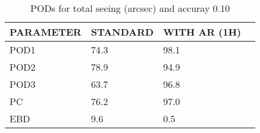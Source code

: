 \begin{table}[]
\begin{center}
\begin{tabular}{|l|l|l|l|}
\hline
\multicolumn{1}{|c|}{\cellcolor[HTML]{C0C0C0}\textbf{PARAMETER}} & \multicolumn{1}{c|}{\cellcolor[HTML]{C0C0C0}\textbf{STANDARD}} & \multicolumn{1}{c|}{\cellcolor[HTML]{C0C0C0}\textbf{WITH AR (1H)}} \\
\hline
\cellcolor[HTML]{C0C0C0}POD1  & 74.3                                & 98.1         \\
\cellcolor[HTML]{C0C0C0}POD2  & 78.9                                & 94.9         \\
\cellcolor[HTML]{C0C0C0}POD3  & 63.7                                & 96.8         \\
\cellcolor[HTML]{C0C0C0}PC    & 76.2                                  & 97.0           \\
\cellcolor[HTML]{C0C0C0}EBD   & 9.6                                 & 0.5          \\
\hline
\end{tabular}
\caption{PODs for total seeing (arcsec) and accuray 0.10}
\end{center}
\end{table}
